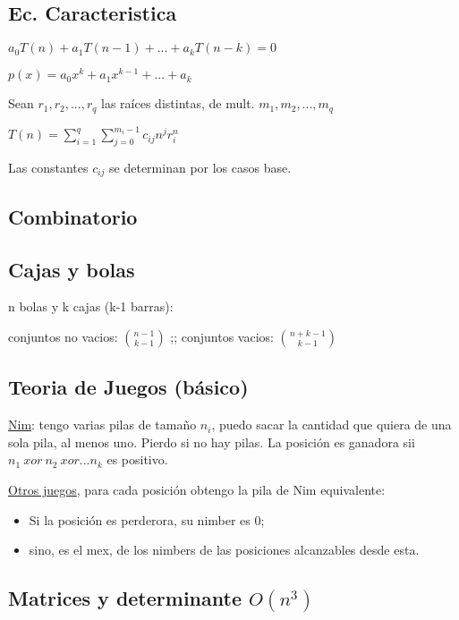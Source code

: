 \subsection{Ec. Caracteristica} %
$a_0T(n)+a_1T(n-1)+...+a_kT(n-k)=0$

$p(x)=a_0 x^k + a_1 x^{k-1} + ... + a_k$

Sean $r_1,r_2,...,r_q$ las raíces distintas, de mult. $m_1, m_2, ..., m_q$

$T(n)=\sum_{i=1}^q{\sum_{j=0}^{m_i - 1}c_{ij} n^j r_i^n}$

Las constantes $c_{ij}$ se determinan por los casos base.
\subsection{Combinatorio}
\subsection{Cajas y bolas}
n bolas y k cajas (k-1 barras):

conjuntos no vacios: $\binom{n-1}{k-1}$ ;; conjuntos vacios: $\binom{n+k-1}{k-1}$

\subsection{Teoria de Juegos (básico)}
\underline{Nim}: tengo varias pilas de tamaño $n_i$, puedo sacar la cantidad que quiera de una sola pila, al menos uno. Pierdo si no hay pilas. La posición es ganadora sii $n_1 ~xor~ n_2 ~xor... n_k$ es positivo.

\underline{Otros juegos}, para cada posición obtengo la pila de Nim equivalente:
\begin{itemize}
\item Si la posición es perderora, su nimber es 0;
\item sino, es el mex, de los nimbers de las posiciones alcanzables desde esta.
\end{itemize}
\subsection{Matrices y determinante $O(n^3)$}
